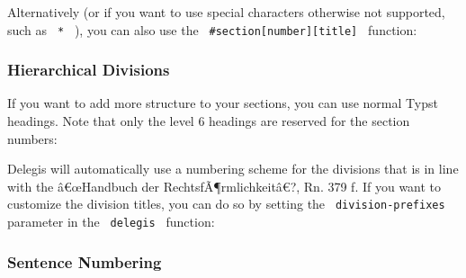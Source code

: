 Alternatively (or if you want to use special characters otherwise not
supported, such as \texttt{\ *\ } ), you can also use the
\texttt{\ \#section{[}number{]}{[}title{]}\ } function:

\begin{Shaded}
\begin{Highlighting}[]
\end{Highlighting}
\end{Shaded}

\subsubsection{Hierarchical Divisions}\label{hierarchical-divisions}

If you want to add more structure to your sections, you can use normal
Typst headings. Note that only the level 6 headings are reserved for the
section numbers:

\begin{Shaded}
\begin{Highlighting}[]





\end{Highlighting}
\end{Shaded}

Delegis will automatically use a numbering scheme for the divisions that
is in line with the â€œHandbuch der RechtsfÃ¶rmlichkeitâ€?, Rn. 379 f.
If you want to customize the division titles, you can do so by setting
the \texttt{\ division-prefixes\ } parameter in the \texttt{\ delegis\ }
function:

\begin{Shaded}
\begin{Highlighting}[]
\NormalTok{)}
\end{Highlighting}
\end{Shaded}

\subsubsection{Sentence Numbering}\label{sentence-numbering}

